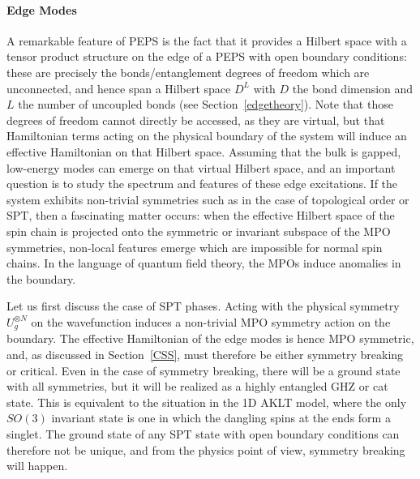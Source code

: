 \documentclass[rmp,aps,reprint,superscriptaddress,nobalancelastpage]{revtex4-1}
\begin{document}
    \paragraph{Edge Modes}
    A remarkable feature of PEPS is the fact that it provides a Hilbert space with a tensor product structure on the edge of a PEPS with open boundary conditions: these are precisely the bonds/entanglement degrees of freedom which are unconnected, and hence span a Hilbert space $D^{L}$ with $D$ the bond dimension and $L$ the number of uncoupled bonds (see Section~\ref{edgetheory}). Note that those degrees of freedom cannot directly be accessed, as they are virtual, but that Hamiltonian terms acting on the physical boundary of the system will induce an effective Hamiltonian on that Hilbert space. Assuming that the bulk is gapped, low-energy modes can emerge on that virtual Hilbert space, and an important question is to study the spectrum and features of these edge excitations. If the system exhibits non-trivial symmetries such as in the case of topological order or SPT, then a fascinating matter occurs: when the effective Hilbert space of the spin chain is projected onto the symmetric or invariant subspace of the MPO symmetries, non-local features emerge which are impossible for normal spin chains. In the language of quantum field theory, the MPOs induce anomalies in the boundary.

    Let us first discuss the case of SPT phases. Acting with the physical symmetry $U_g^{\otimes N}$ on the wavefunction induces a non-trivial MPO symmetry action on the boundary. The effective Hamiltonian of the edge modes
    is hence MPO symmetric, and, as discussed in Section~\ref{CSS}, must therefore be either symmetry breaking or critical. Even  in the case of symmetry breaking, there will be a ground state with all symmetries, but it will be realized as a highly entangled GHZ or cat state. This is equivalent to the situation in the 1D AKLT model, where the only $SO(3)$ invariant state is one in which the dangling spins at the ends form a singlet. The ground state of any SPT state with open boundary conditions can therefore not be unique, and from the physics point of view, symmetry breaking will happen.
\end{document}
